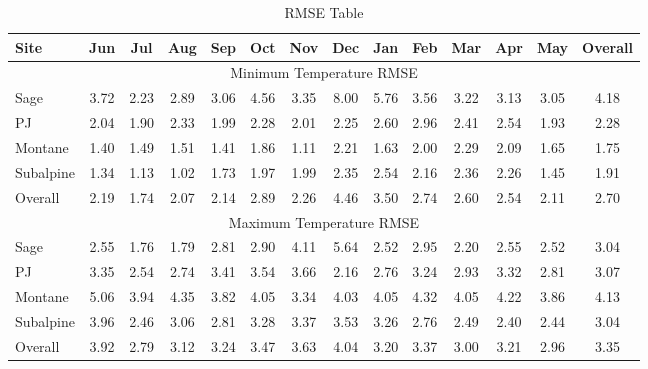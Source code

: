 \documentclass{ametsoc}
\begin{document}
\begin{table}[t]
\caption{RMSE Table}
\begin{center}
\begin{tabular}{lccccccccccccc}
\hline\hline
Site      & Jun  & Jul  & Aug  & Sep  & Oct  & Nov  & Dec  & Jan  & Feb  & Mar  & Apr  & May  & Overall \\
\hline
\multicolumn{14}{c}{Minimum Temperature RMSE}                                                           \\
Sage      & 3.72 & 2.23 & 2.89 & 3.06 & 4.56 & 3.35 & 8.00 & 5.76 & 3.56 & 3.22 & 3.13 & 3.05 & 4.18    \\
PJ        & 2.04 & 1.90 & 2.33 & 1.99 & 2.28 & 2.01 & 2.25 & 2.60 & 2.96 & 2.41 & 2.54 & 1.93 & 2.28    \\
Montane   & 1.40 & 1.49 & 1.51 & 1.41 & 1.86 & 1.11 & 2.21 & 1.63 & 2.00 & 2.29 & 2.09 & 1.65 & 1.75    \\
Subalpine & 1.34 & 1.13 & 1.02 & 1.73 & 1.97 & 1.99 & 2.35 & 2.54 & 2.16 & 2.36 & 2.26 & 1.45 & 1.91    \\
Overall   & 2.19 & 1.74 & 2.07 & 2.14 & 2.89 & 2.26 & 4.46 & 3.50 & 2.74 & 2.60 & 2.54 & 2.11 & 2.70    \\
\multicolumn{14}{c}{Maximum Temperature RMSE}                                                           \\
Sage      & 2.55 & 1.76 & 1.79 & 2.81 & 2.90 & 4.11 & 5.64 & 2.52 & 2.95 & 2.20 & 2.55 & 2.52 & 3.04    \\
PJ        & 3.35 & 2.54 & 2.74 & 3.41 & 3.54 & 3.66 & 2.16 & 2.76 & 3.24 & 2.93 & 3.32 & 2.81 & 3.07    \\
Montane   & 5.06 & 3.94 & 4.35 & 3.82 & 4.05 & 3.34 & 4.03 & 4.05 & 4.32 & 4.05 & 4.22 & 3.86 & 4.13    \\
Subalpine & 3.96 & 2.46 & 3.06 & 2.81 & 3.28 & 3.37 & 3.53 & 3.26 & 2.76 & 2.49 & 2.40 & 2.44 & 3.04    \\
Overall   & 3.92 & 2.79 & 3.12 & 3.24 & 3.47 & 3.63 & 4.04 & 3.20 & 3.37 & 3.00 & 3.21 & 2.96 & 3.35    \\
\hline
\end{tabular}
\end{center}
\end{table}
\end{document}
